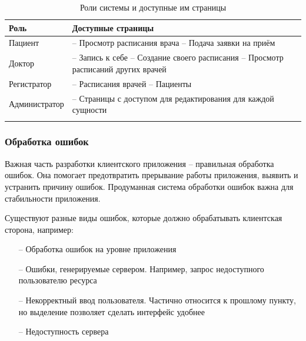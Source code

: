 \documentclass[a4paper,article]{article}
\begin{document}
    \begin{xltabular}{\textwidth} { |
        >{\hsize} X |
        >{\hsize} X | }

        \hline
        Роль
        & Доступные страницы \\

        \hline
        Пациент
        & -- Просмотр расписания врача \newline -- Подача заявки на приём \\

        \hline
        Доктор
        & -- Запись к себе \newline -- Создание своего расписания \newline -- Просмотр расписаний других врачей \\

        \hline
        Регистратор
        & -- Расписания врачей \newline -- Пациенты \\

        \hline
        Администратор
        & -- Страницы с доступом для редактирования для каждой сущности \\

        \hline

        \caption{\centering Роли системы и доступные им страницы}

        \label{tab:Роли в системе и доступные им страницы}
    \end{xltabular}

    \subsubsection{Обработка ошибок}\label{Проектирование клиента. Обработка ошибок}

    Важная часть разработки клиентского приложения -- правильная обработка ошибок. Она помогает предотвратить прерывание работы приложения, выявить и устранить причину ошибок. Продуманная система обработки ошибок важна для стабильности приложения.

    Существуют разные виды ошибок, которые должно обрабатывать клиентская сторона, например:

    \begin{itemize}[nolistsep]
        \item[--] Обработка ошибок на уровне приложения
        \item[--] Ошибки, генерируемые сервером. Например, запрос недоступного пользователю ресурса
        \item[--] Некорректный ввод пользователя. Частично относится к прошлому пункту, но выделение позволяет сделать интерфейс удобнее
        \item[--] Недоступность сервера
    \end{itemize}
\end{document}
